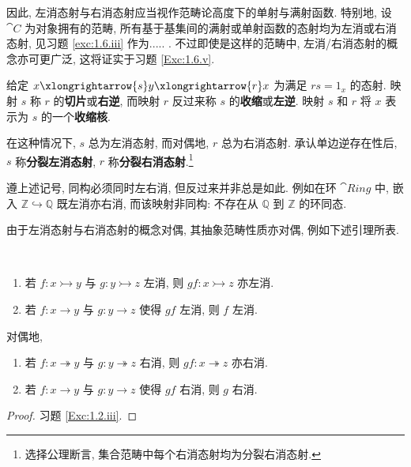 \par 因此, 左消态射与右消态射应当视作范畴论高度下的单射与满射函数. 特别地, 设 \(\cat C\) 为对象拥有的范畴, 所有基于基集间的满射或单射函数的态射均为左消或右消态射, 见习题 \ref{exc:1.6.iii} 作为..... . 不过即使是这样的范畴中, 左消/右消态射的概念亦可更广泛, 这将证实于习题 \ref{Exc:1.6.v}.
\begin{example}
    给定 \(x\xlongrightarrow{s}y\xlongrightarrow{r}x\) 为满足 \(rs=1_x\) 的态射. 映射 \(s\) 称 \(r\) 的\textbf{切片}或\textbf{右逆}, 而映射 \(r\) 反过来称 \(s\) 的\textbf{收缩}或\textbf{左逆}. 映射 \(s\) 和 \(r\) 将 \(x\) 表示为 \(s\) 的一个\textbf{收缩核}.
\par 在这种情况下, \(s\) 总为左消态射, 而对偶地, \(r\) 总为右消态射. 承认单边逆存在性后, \(s\) 称\textbf{分裂左消态射}, \(r\) 称\textbf{分裂右消态射}.\footnote{选择公理断言, 集合范畴中每个右消态射均为分裂右消态射.}
\end{example}
\begin{example}
    遵上述记号, 同构必须同时左右消, 但反过来并非总是如此. 例如在环 \(\cat{Ring}\) 中, 嵌入 \(\mathbb Z\hookrightarrow\mathbb Q\) 既左消亦右消, 而该映射非同构: 不存在从 \(\mathbb Q\) 到 \(\mathbb Z\) 的环同态.
\end{example}
\par 由于左消态射与右消态射的概念对偶, 其抽象范畴性质亦对偶, 例如下述引理所表.
\begin{lemma}\label{Lem:1.2.11}
    \ \begin{enumerate}[label=(\roman*)]
        \item 若 \(f\colon x\rightarrowtail y \) 与 \(g\colon y\rightarrowtail z\) 左消, 则 \(gf\colon x\rightarrowtail z\) 亦左消.
        \item 若 \(f\colon x\to y\) 与 \(g\colon y\to z\) 使得 \(gf\) 左消, 则 \(f\) 左消.
    \end{enumerate}对偶地,\begin{enumerate}[label=(\roman*')]
        \item 若 \(f\colon x\twoheadrightarrow y\) 与 \(g\colon y\twoheadrightarrow z\) 右消, 则 \(gf\colon x\twoheadrightarrow z\) 亦右消.
        \item 若 \(f\colon x\to y \) 与 \(g\colon y\to z\) 使得 \(gf\) 右消, 则 \(g\) 右消.
    \end{enumerate}
\end{lemma}
\begin{proof}
    习题 \ref{Exc:1.2.iii}.
\end{proof}
\Exercises
